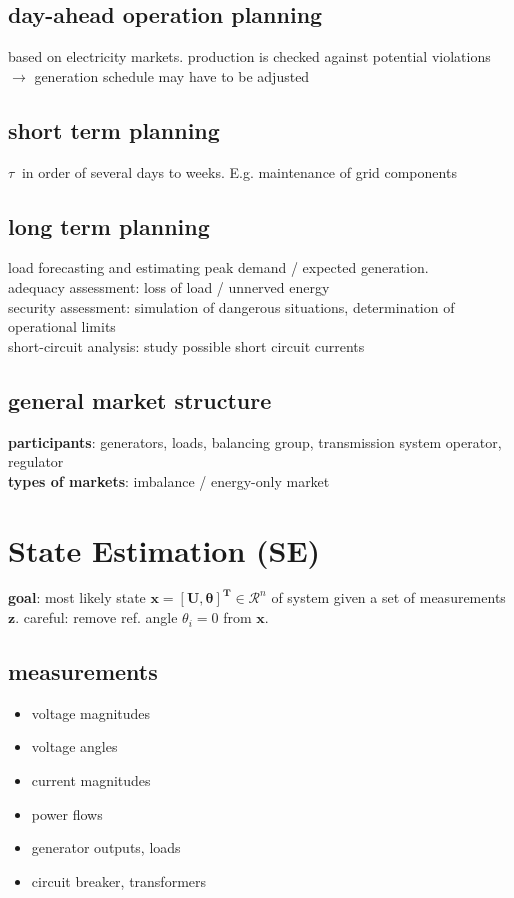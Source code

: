 \documentclass[a4paper,10pt,landscape]{scrartcl}
\begin{document}
\begin{multicols*}{3}
\subsection{day-ahead operation planning}
based on electricity markets. production is checked against potential violations $\rightarrow$ generation schedule may have to be adjusted

\subsection{short term planning}
$\tau~$ in order of several days to weeks. E.g. maintenance of grid components

\subsection{long term planning}
load forecasting and estimating peak demand / expected generation. \\
adequacy assessment: loss of load / unnerved energy \\
security assessment: simulation of dangerous situations, determination of operational limits \\
short-circuit analysis: study possible short circuit currents \\

\subsection{general market structure}
\textbf{participants}: generators, loads, balancing group, transmission system operator, regulator \\
\textbf{types of markets}: imbalance / energy-only market

\section{State Estimation (SE)}
\textbf{goal}: most likely state $\mathbf{x=[U,\theta]^T}\in \mathcal{R}^n$ of system given a set of measurements $\mathbf{z}$. careful: remove ref. angle $\theta_i=0$ from $\mathbf{x}$.

\subsection{measurements}
\begin{itemize}
    \item voltage magnitudes
    \item voltage angles
    \item current magnitudes
    \item power flows
    \item generator outputs, loads
    \item circuit breaker, transformers
\end{itemize}


\end{multicols*}
\end{document}
